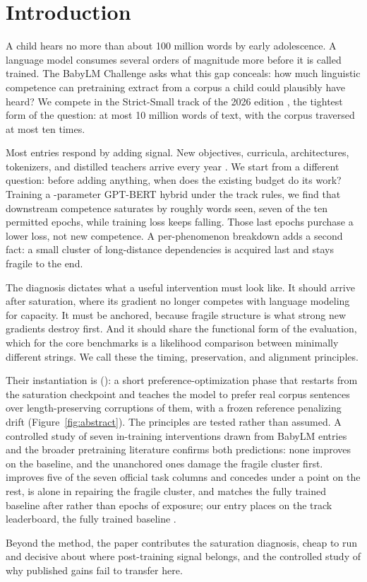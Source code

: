 \section{Introduction}
\label{sec:intro}

A child hears no more than about 100 million words by early adolescence. A
language model consumes several orders of magnitude more before it is
called trained. The BabyLM Challenge asks what this gap conceals: how much
linguistic competence can pretraining extract from a corpus a child could
plausibly have heard? \citep{warstadt2023findings,charpentier2025findings}
We compete in the Strict-Small track of the 2026 edition
\citep{choshen2026babylm}, the tightest form of the question: at most 10
million words of text, with the corpus traversed at most ten times.

Most entries respond by adding signal. New objectives, curricula,
architectures, tokenizers, and distilled teachers arrive every year
\citep{hu2024findings,charpentier2025findings}. We start from a different
question: before adding anything, when does the existing budget do its work?
Training a \rParamsM{}-parameter GPT-BERT hybrid
\citep{charpentier2024gptbert} under the track rules, we find that
downstream competence saturates by roughly \rPeakCkpt{} words seen, seven of
the ten permitted epochs, while training loss keeps falling. Those last
epochs purchase a lower loss, not new competence. A per-phenomenon breakdown
adds a second fact: a small cluster of long-distance dependencies is
acquired last and stays fragile to the end.

The diagnosis dictates what a useful intervention must look like. It should
arrive after saturation, where its gradient no longer competes with language
modeling for capacity. It must be anchored, because fragile structure is
what strong new gradients destroy first. And it should share the functional
form of the evaluation, which for the core benchmarks is a likelihood
comparison between minimally different strings. We call these the timing,
preservation, and alignment principles.

Their instantiation is \MPOlong{} (\MPO{}): a short preference-optimization
phase \citep{rafailov2023dpo} that restarts from the saturation checkpoint
and teaches the model to prefer real corpus sentences over length-preserving
corruptions of them, with a frozen reference penalizing drift
(Figure~\ref{fig:abstract}). The principles are tested rather than assumed.
A controlled study of seven in-training interventions drawn from BabyLM
entries and the broader pretraining literature confirms both predictions:
none improves on the baseline, and the unanchored ones damage the fragile
cluster first. \MPO{} improves five of the seven official task columns and concedes
under a point on the rest, is alone in repairing the fragile cluster,
and matches the fully trained baseline after \rDpoEpochs{} rather than
\rEpochs{} epochs of exposure; our \MPO{} entry places \rRankDpo{} on the
track leaderboard, the fully trained baseline \rRankBase{}.

Beyond the method, the paper contributes the saturation diagnosis, cheap
to run and decisive about where post-training signal belongs, and the
controlled study of why published gains fail to transfer here.

